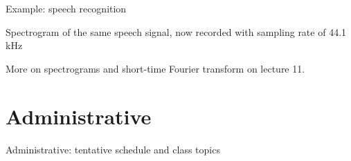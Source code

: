 \documentclass[10pt]{beamer}
\begin{document}
%
\begin{frame}{Example: speech recognition}

Spectrogram of the same speech signal, now recorded with sampling rate of 44.1 kHz
\vspace{0.5cm}

\begin{center}
\end{center}

More on spectrograms and short-time Fourier transform on lecture 11.

\end{frame}


\section{Administrative}

%
\begin{frame}{Administrative: tentative schedule and class topics}

\centering
\resizebox{\linewidth}{!}{}

\end{frame}
\end{document}
